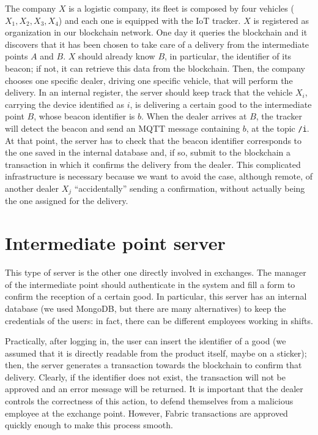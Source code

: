 The company $X$ is a logistic company, its fleet is composed by four vehicles ($X_1, X_2, X_3, X_4$) and each one is equipped with the IoT tracker. $X$ is registered as organization in our blockchain network. One day it queries the blockchain and it discovers that it has been chosen to take care of a delivery from the intermediate points $A$ and $B$. $X$ should already know $B$, in particular, the identifier of its beacon; if not, it can retrieve this data from the blockchain. Then, the company chooses one specific dealer, driving one specific vehicle, that will perform the delivery. In an internal register, the server should keep track that the vehicle $X_i$, carrying the device identified as $i$, is delivering a certain good to the intermediate point $B$, whose beacon identifier is $b$. When the dealer arrives at $B$, the tracker will detect the beacon and send an MQTT message containing $b$, at the topic \texttt{/i}. At that point, the server has to check that the beacon identifier corresponds to the one saved in the internal database and, if so, submit to the blockchain a transaction in which it confirms the delivery from the dealer. This complicated infrastructure is necessary because we want to avoid the case, although remote, of another dealer $X_j$ ``accidentally'' sending a confirmation, without actually being the one assigned for the delivery.

\section{Intermediate point server}
This type of server is the other one directly involved in exchanges. The manager of the intermediate point should authenticate in the system and fill a form to confirm the reception of a certain good. In particular, this server has an internal database (we used MongoDB, but there are many alternatives) to keep the credentials of the users: in fact, there can be different employees working in shifts. 

Practically, after logging in, the user can insert the identifier of a good (we assumed that it is directly readable from the product itself, maybe on a sticker); then, the server generates a transaction towards the blockchain to confirm that delivery. Clearly, if the identifier does not exist, the transaction will not be approved and an error message will be returned. It is important that the dealer controls the correctness of this action, to defend themselves from a malicious employee at the exchange point. However, Fabric transactions are approved quickly enough to make this process smooth. 

